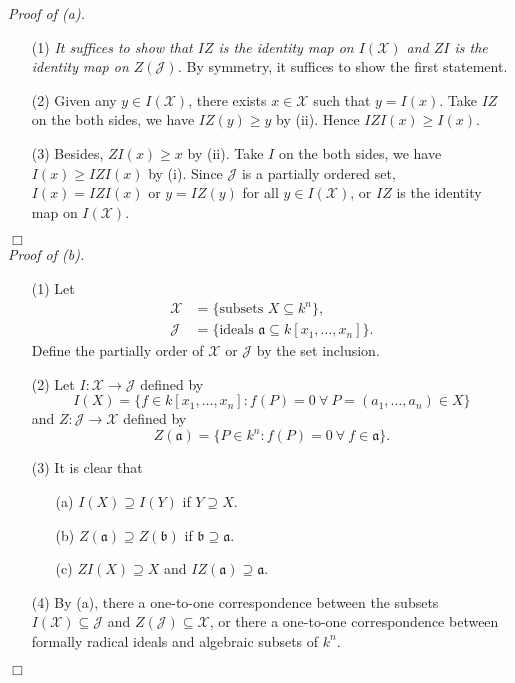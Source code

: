 \documentclass{article}
\begin{document}
\emph{Proof of (a).}
\begin{enumerate}
  \item[(1)]
  \emph{It suffices to show that $IZ$ is the identity map on $I(\mathcal{X})$
  and $ZI$ is the identity map on $Z(\mathcal{J})$.}
  By symmetry, it suffices to show the first statement.
  \item[(2)]
  Given any $y \in I(\mathcal{X})$, there exists $x \in \mathcal{X}$ such that $y = I(x)$.
  Take $IZ$ on the both sides, we have $IZ(y) \geq y$ by (ii).
  Hence $IZI(x) \geq I(x)$.
  \item[(3)]
  Besides, $ZI(x) \geq x$ by (ii). Take $I$ on the both sides,
  we have $I(x) \geq IZI(x)$ by (i).
  Since $\mathcal{J}$ is a partially ordered set,
  $I(x) = IZI(x)$
  or $y = IZ(y)$ for all $y \in I(\mathcal{X})$,
  or $IZ$ is the identity map on $I(\mathcal{X})$.
\end{enumerate}
$\Box$ \\

\emph{Proof of (b).}
\begin{enumerate}
  \item[(1)]
  Let
  \begin{align*}
    \mathcal{X} &= \{ \text{subsets } X \subseteq k^n \}, \\
    \mathcal{J} &= \{ \text{ideals } \mathfrak{a} \subseteq k[x_1,\ldots,x_n] \}.
  \end{align*}
  Define the partially order of $\mathcal{X}$ or $\mathcal{J}$ by the set inclusion.
  \item[(2)]
  Let $I: \mathcal{X} \to \mathcal{J}$ defined by
  \[
    I(X)
    = \{ f \in k[x_1,\ldots,x_n] : f(P) = 0
      \: \forall \: P = (a_1, \ldots, a_n) \in X \}
  \]
  and $Z: \mathcal{J} \to \mathcal{X}$ defined by
  \[
    Z(\mathfrak{a})
    = \{ P \in k^n : f(P) = 0
      \: \forall \: f \in \mathfrak{a} \}.
  \]
  \item[(3)]
  It is clear that
    \begin{enumerate}
    \item[(a)]
      $I(X) \supseteq I(Y)$ if $Y \supseteq X$.
    \item[(b)]
      $Z(\mathfrak{a}) \supseteq Z(\mathfrak{b})$ if $\mathfrak{b} \supseteq \mathfrak{a}$.
    \item[(c)]
      $ZI(X) \supseteq X$ and $IZ(\mathfrak{a}) \supseteq \mathfrak{a}$.
    \end{enumerate}
  \item[(4)]
  By (a),
  there a one-to-one correspondence between
  the subsets $I(\mathcal{X}) \subseteq \mathcal{J}$ and $Z(\mathcal{J}) \subseteq \mathcal{X}$,
  or there a one-to-one correspondence between
  formally radical ideals and algebraic subsets of $k^n$.
\end{enumerate}
$\Box$ \\\\
\end{document}
